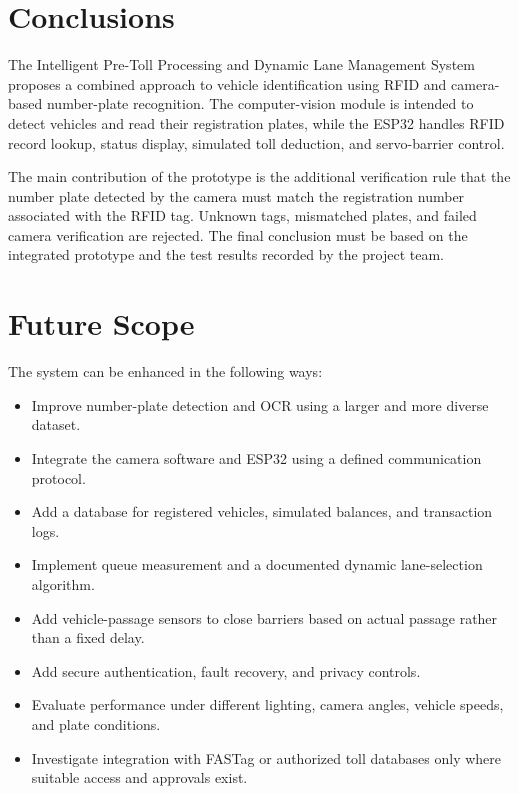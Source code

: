 \documentclass[12pt,a4paper]{report}
\begin{document}
\section{Conclusions}
The Intelligent Pre-Toll Processing and Dynamic Lane Management System proposes a
combined approach to vehicle identification using RFID and camera-based number-plate
recognition. The computer-vision module is intended to detect vehicles and read their
registration plates, while the ESP32 handles RFID record lookup, status display, simulated
toll deduction, and servo-barrier control.

The main contribution of the prototype is the additional verification rule that the
number plate detected by the camera must match the registration number associated
with the RFID tag. Unknown tags, mismatched plates, and failed camera verification
are rejected. The final conclusion must be based on the integrated prototype and the
test results recorded by the project team.

\section{Future Scope}
The system can be enhanced in the following ways:
\begin{itemize}
\item Improve number-plate detection and OCR using a larger and more diverse dataset.
\item Integrate the camera software and ESP32 using a defined communication protocol.
\item Add a database for registered vehicles, simulated balances, and transaction logs.
\item Implement queue measurement and a documented dynamic lane-selection algorithm.
\item Add vehicle-passage sensors to close barriers based on actual passage rather than a fixed delay.
\item Add secure authentication, fault recovery, and privacy controls.
\item Evaluate performance under different lighting, camera angles, vehicle speeds, and plate conditions.
\item Investigate integration with FASTag or authorized toll databases only where suitable access and approvals exist.
\end{itemize}
\end{document}
